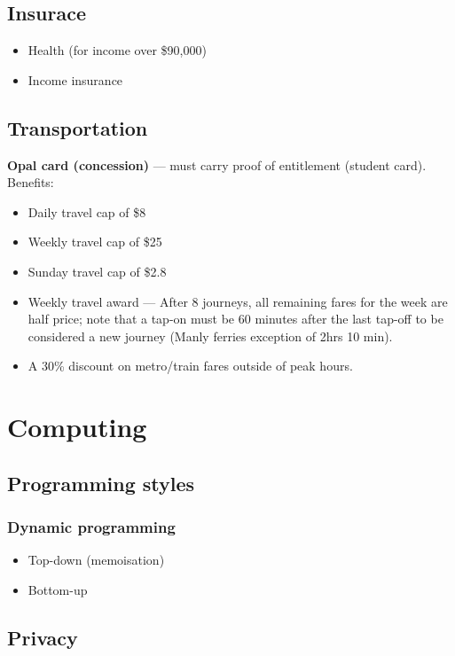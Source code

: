 \documentclass[oneside]{book}
\begin{document}
\section{Insurace}
\begin{itemize}
	\item Health (for income over \$90,000)
	\item Income insurance
\end{itemize}

\section{Transportation}

\textbf{Opal card (concession)} --- must carry proof of entitlement (student card). Benefits:

\begin{itemize}
	\item Daily travel cap of \$8
	\item Weekly travel cap of \$25
	\item Sunday travel cap of \$2.8
	\item Weekly travel award --- After 8 journeys, all remaining fares for the week are half price; note that a tap-on must be 60 minutes after the last tap-off to be considered a new journey (Manly ferries exception of 2hrs 10 min).
	\item A 30\% discount on metro/train fares outside of peak hours.
\end{itemize}

\chapter{Computing}

\section{Programming styles}
\subsection{Dynamic programming}
\begin{itemize}
	\item Top-down (memoisation)
	\item Bottom-up
\end{itemize}

\section{Privacy}
\end{document}
